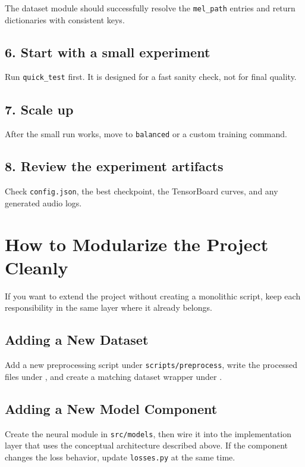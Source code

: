 \documentclass[11pt]{article}
\newcommand{\pathtt}[1]{\texttt{#1}}
\begin{document}
The dataset module should successfully resolve the \pathtt{mel\_path} entries and return dictionaries with consistent keys.

\subsection{6. Start with a small experiment}

Run \pathtt{quick\_test} first. It is designed for a fast sanity check, not for final quality.

\subsection{7. Scale up}

After the small run works, move to \pathtt{balanced} or a custom training command.

\subsection{8. Review the experiment artifacts}

Check \pathtt{config.json}, the best checkpoint, the TensorBoard curves, and any generated audio logs.

\section{How to Modularize the Project Cleanly}

If you want to extend the project without creating a monolithic script, keep each responsibility in the same layer where it already belongs.

\subsection{Adding a New Dataset}

Add a new preprocessing script under \pathtt{scripts/preprocess}, write the processed files under , and create a matching dataset wrapper under .

\subsection{Adding a New Model Component}

Create the neural module in \pathtt{src/models}, then wire it into the implementation layer that uses the conceptual architecture described above. If the component changes the loss behavior, update \pathtt{losses.py} at the same time.
\end{document}
